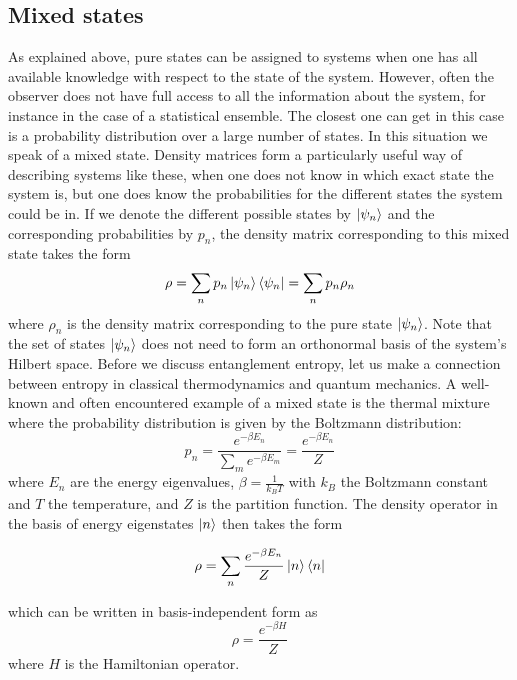 \documentclass[12pt,oneside,openright]{report}
\theoremstyle{definition}
\theoremstyle{plain}
\theoremstyle{remark}
\begin{document}
\subsection{Mixed states}
As explained above, pure states can be assigned to systems when one has all available knowledge
with respect to the state of the system. However, often the observer does not have full access
to all the information about the system, for instance in the case of a statistical ensemble. The
closest one can get in this case is a probability distribution over a large number of states. In this
situation we speak of a mixed state.
Density matrices form a particularly useful way of describing systems like these, when one
does not know in which exact state the system is, but one does know the probabilities for the
different states the system could be in. If we denote the different possible states by $ \ket{\psi_n} $
and the corresponding probabilities by $p_n$, the density matrix corresponding to this mixed state takes
the form
\begin{equation}
\rho = \sum_{n} p_n \ket{\psi_n} \bra{\psi_n} = \sum_{n} p_n \rho_n
\end{equation}
where  $ \rho_n $ is the density matrix corresponding to the pure state $ \ket{\psi_n} $.
Note that the set of states $ \ket{\psi_n} $ does not need to form an orthonormal basis of the system's Hilbert space.
Before we discuss entanglement entropy, let us make a connection between entropy in classical thermodynamics
and quantum mechanics. A well-known and often encountered example of a mixed state is the thermal mixture where
the probability distribution is given by the Boltzmann distribution:
\begin{equation}  
p_n = \frac{e^{-\beta E_n}}{\sum_{m} e^{-\beta E_m}} = \frac{e^{-\beta E_n}}{Z}
\end{equation}
where $E_n$ are the energy eigenvalues, $\beta = \frac{1}{k_B T}$ with $k_B$ the Boltzmann constant
and $T$ the temperature, and $Z$ is the partition function.
The density operator in the basis of energy eigenstates $ \ket{n} $ then takes the form

\begin{equation}
\rho = \sum_n \frac{e^{-\beta E_n}}{Z} \ket{n} \bra{n}
\end{equation}

which can be written in basis-independent form as
\begin{equation}
\rho = \frac{e^{-\beta H}}{Z}
\end{equation}
where $H$ is the Hamiltonian operator.
\end{document}
